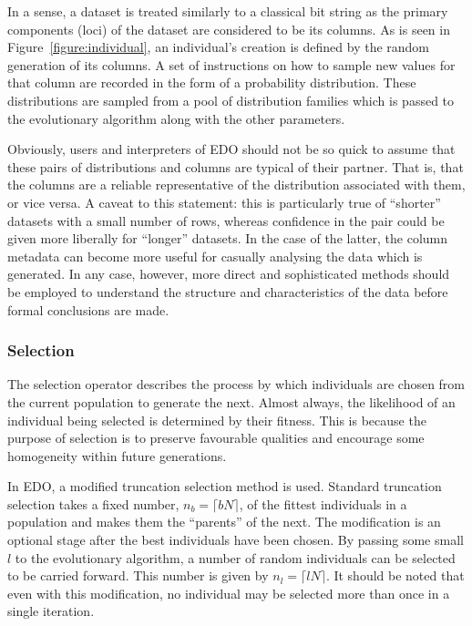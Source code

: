 
In a sense, a dataset is treated similarly to a classical bit string as the
primary components (loci) of the dataset are considered to be its columns. As is
seen in Figure~\ref{figure:individual}, an individual's creation is defined by
the random generation of its columns. A set of instructions on how to sample new
values for that column are recorded in the form of a probability distribution.
These distributions are sampled from a pool of distribution families which is
passed to the evolutionary algorithm along with the other parameters.

Obviously, users and interpreters of EDO should not be so quick to assume that
these pairs of distributions and columns are typical of their partner. That is,
that the columns are a reliable representative of the distribution associated
with them, or vice versa. A caveat to this statement: this is particularly true
of ``shorter'' datasets with a small number of rows, whereas confidence in the
pair could be given more liberally for ``longer'' datasets. In the case of the
latter, the column metadata can become more useful for casually analysing the
data which is generated. In any case, however, more direct and sophisticated
methods should be employed to understand the structure and characteristics of
the data before formal conclusions are made.



\subsubsection{Selection}

The selection operator describes the process by which individuals are chosen
from the current population to generate the next. Almost always, the likelihood
of an individual being selected is determined by their fitness. This is because
the purpose of selection is to preserve favourable qualities and encourage some
homogeneity within future generations.

In EDO, a modified truncation selection method is used. Standard truncation
selection takes a fixed number, \(n_b = \lceil bN\rceil\), of the fittest
individuals in a population and makes them the ``parents'' of the next. The
modification is an optional stage after the best individuals have been chosen.
By passing some small \(l\) to the evolutionary algorithm, a number of random
individuals can be selected to be carried forward. This number is given by \(n_l
= \lceil lN \rceil\). It should be noted that even with this modification, no
individual may be selected more than once in a single iteration.

